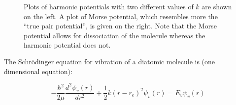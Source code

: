 \documentclass[byrevtex,amssymb,aps,pra,floatfix,letterpaper]{revtex4}
\begin{document}
\begin{figure}[!h]
\begin{center}
\end{center}
\caption{Plots of harmonic potentials with two different values of $k$ are shown on the left. A plot of Morse potential, which resembles more the ``true pair potential'', is given on the right. Note that the Morse potential allows for dissociation of the molecule whereas the harmonic potential does not.}
\label{fig1}
\end{figure}

The Schr\"odinger equation for vibration of a diatomic molecule is (one dimensional equation):

\begin{equation}
-\frac{\hbar^2}{2\mu}\frac{d^2\psi_v(r)}{dr^2} + \frac{1}{2}k(r - r_e)^2\psi_v(r) = E_v\psi_v(r)
\label{eq3}
\end{equation}
\end{document}
